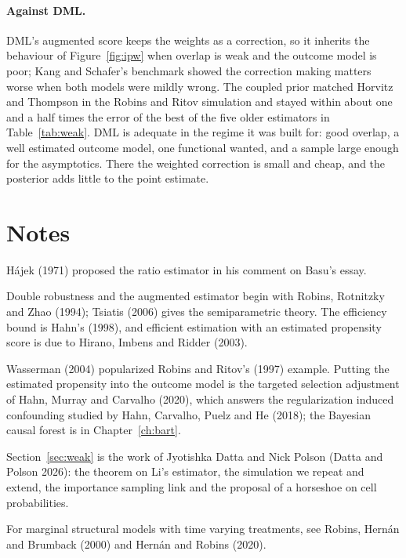 \paragraph{Against DML.} DML's augmented score keeps the weights as a correction, so it inherits the behaviour of Figure~\ref{fig:ipw} when overlap is weak and the outcome model is poor; Kang and Schafer's benchmark showed the correction making matters worse when both models were mildly wrong. The coupled prior matched Horvitz and Thompson in the Robins and Ritov simulation and stayed within about one and a half times the error of the best of the five older estimators in Table~\ref{tab:weak}. DML is adequate in the regime it was built for: good overlap, a well estimated outcome model, one functional wanted, and a sample large enough for the asymptotics. There the weighted correction is small and cheap, and the posterior adds little to the point estimate.

\section*{Notes}

H\'ajek (1971) proposed the ratio estimator in his comment on Basu's essay.

Double robustness and the augmented estimator begin with Robins, Rotnitzky and Zhao (1994); Tsiatis (2006) gives the semiparametric theory. The efficiency bound is Hahn's (1998), and efficient estimation with an estimated propensity score is due to Hirano, Imbens and Ridder (2003).

Wasserman (2004) popularized Robins and Ritov's (1997) example. Putting the estimated propensity into the outcome model is the targeted selection adjustment of Hahn, Murray and Carvalho (2020), which answers the regularization induced confounding studied by Hahn, Carvalho, Puelz and He (2018); the Bayesian causal forest is in Chapter~\ref{ch:bart}.

Section~\ref{sec:weak} is the work of Jyotishka Datta and Nick Polson (Datta and Polson 2026): the theorem on Li's estimator, the simulation we repeat and extend, the importance sampling link and the proposal of a horseshoe on cell probabilities.

For marginal structural models with time varying treatments, see Robins, Hern\'an and Brumback (2000) and Hern\'an and Robins (2020).

